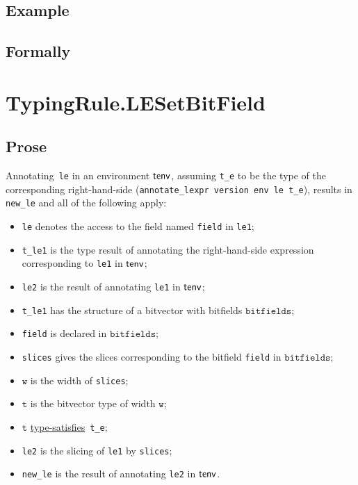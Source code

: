 \documentclass{book}
\newcommand\typesatisfies[0]{\hyperlink{def-typesatisfies}{type-satisfies}}
\newcommand\vt[0]{\texttt{t}}
\newcommand\vw[0]{\texttt{w}}
\newcommand\bitfields[0]{\texttt{bitfields}}
\begin{document}
  \subsection{Example}



\begin{emptyformal}
    \subsection{Formally}
\end{emptyformal}


\section{TypingRule.LESetBitField \label{sec:TypingRule.LESetBitField}}

    \subsection{Prose}
   Annotating~\texttt{le} in an environment $\textsf{tenv}$, assuming
\texttt{t\_e} to be the type of the corresponding right-hand-side
(\texttt{annotate\_lexpr version env le t\_e}), results in \texttt{new\_le} and
all of the following apply:
   \begin{itemize}
   \item \texttt{le} denotes the access to the field named \texttt{field} in \texttt{le1};
   \item \texttt{t\_le1} is the type result of annotating the right-hand-side expression corresponding to \texttt{le1} in $\textsf{tenv}$;
   \item \texttt{le2} is the result of annotating \texttt{le1} in $\textsf{tenv}$;
   \item \texttt{t\_le1} has the structure of a bitvector with bitfields $\bitfields$;
   \item \texttt{field} is declared in $\bitfields$;
   \item \texttt{slices} gives the slices corresponding to the bitfield \texttt{field} in
      $\bitfields$;
   \item $\vw$ is the width of \texttt{slices};
   \item $\vt$ is the bitvector type of width $\vw$;
   \item $\vt$ \typesatisfies\  \texttt{t\_e};
   \item \texttt{le2} is the slicing of \texttt{le1} by \texttt{slices};
   \item \texttt{new\_le} is the result of annotating \texttt{le2} in $\textsf{tenv}$.
   \end{itemize}
\end{document}
